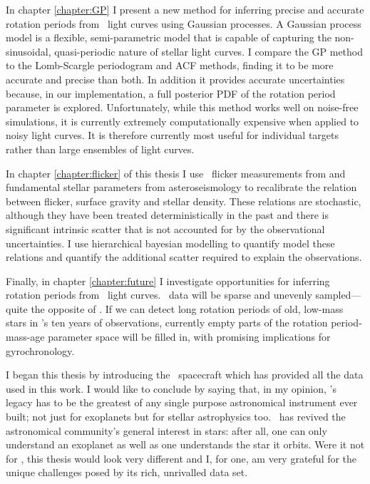 In chapter \ref{chapter:GP} I present a new method for inferring precise and
accurate rotation periods from \kepler\ light curves using Gaussian processes.
A Gaussian process model is a flexible, semi-parametric model that is capable
of capturing the non-sinusoidal, quasi-periodic nature of stellar light
curves.
I compare the GP method to the Lomb-Scargle periodogram and ACF methods,
finding it to be more accurate and precise than both.
In addition it provides accurate uncertainties because, in our implementation,
a full posterior PDF of the rotation period parameter is explored.
Unfortunately, while this method works well on noise-free simulations, it is
currently extremely computationally expensive when applied to noisy light
curves.
It is therefore currently most useful for individual targets rather than large
ensembles of light curves.

In chapter \ref{chapter:flicker} of this thesis I use \kepler\ flicker
measurements from \citet{Bastien2013} and fundamental stellar parameters from
asteroseismology to recalibrate the relation between flicker, surface gravity
and stellar density.
These relations are stochastic, although they have been treated
deterministically in the past \citep[\eg][]{Bastien2013, Kipping2014} and
there is significant intrinsic scatter that is not accounted for by the
observational uncertainties.
I use hierarchical bayesian modelling to quantify  model these relations and
quantify the additional scatter required to explain the observations.

Finally, in chapter \ref{chapter:future} I investigate opportunities for
inferring rotation periods from \LSST\ light curves.
\LSST\ data will be sparse and unevenly sampled---quite the opposite of
\kepler.
If we can detect long rotation periods of old, low-mass stars in \LSST's ten
years of observations, currently empty parts of the rotation period-mass-age
parameter space will be filled in, with promising implications for
gyrochronology.

I began this thesis by introducing the \kepler\ spacecraft which has provided
all the data used in this work.
I would like to conclude by saying that, in my opinion, \kepler's legacy has
to be the greatest of any single purpose astronomical instrument ever built;
not just for exoplanets but for stellar astrophysics too.
\kepler\ has revived the astronomical community's general interest in stars:
after all, one can only understand an exoplanet as well as one understands the
star it orbits.
Were it not for \kepler, this thesis would look very different and I, for one,
am very grateful for the unique challenges posed by its rich, unrivalled data
set.
